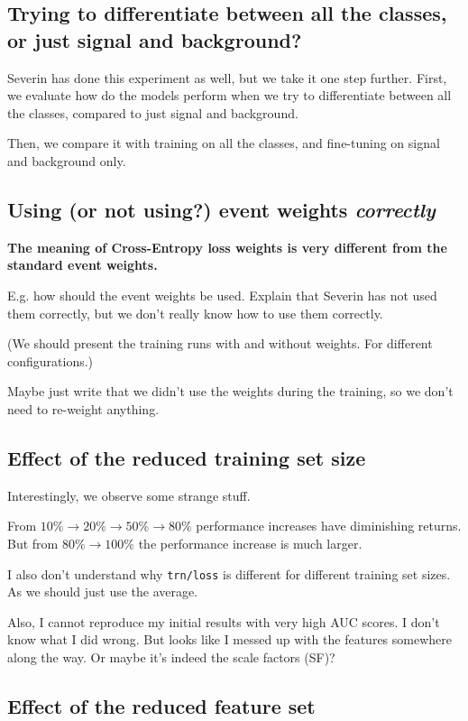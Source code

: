 \documentclass[twoside,draft,a4paper]{article}
\begin{document}
\subsection{Trying to differentiate between all the classes, or just signal and background?}

Severin has done this experiment as well, but we take it one step further. First, we evaluate how do the models perform
when we try to differentiate between all the classes, compared to just signal and background.

Then, we compare it with training on all the classes, and fine-tuning on signal and background only.


\subsection{Using (or not using?) event weights \em{correctly}}

\textbf{The meaning of Cross-Entropy loss weights is very different from the standard event weights.}

E.g. how should the event weights be used. Explain that Severin has not used them correctly,
but we don't really know how to use them correctly.

(We should present the training runs with and without weights. For different configurations.)

Maybe just write that we didn't use the weights during the training, so we don't need to re-weight anything.


\subsection{Effect of the reduced training set size}

Interestingly, we observe some strange stuff.

From $10\% \rightarrow 20\% \rightarrow 50\% \rightarrow 80\%$ performance increases have diminishing returns.
But from $80\% \rightarrow 100\%$ the performance increase is much larger.

I also don't understand why \verb|trn/loss| is different for different training set sizes. As we should just use the
average.

Also, I cannot reproduce my initial results with very high AUC scores. I don't know what I did wrong. But looks like I
messed up with the features somewhere along the way. Or maybe it's indeed the scale factors (SF)?


\subsection{Effect of the reduced feature set}
\end{document}

